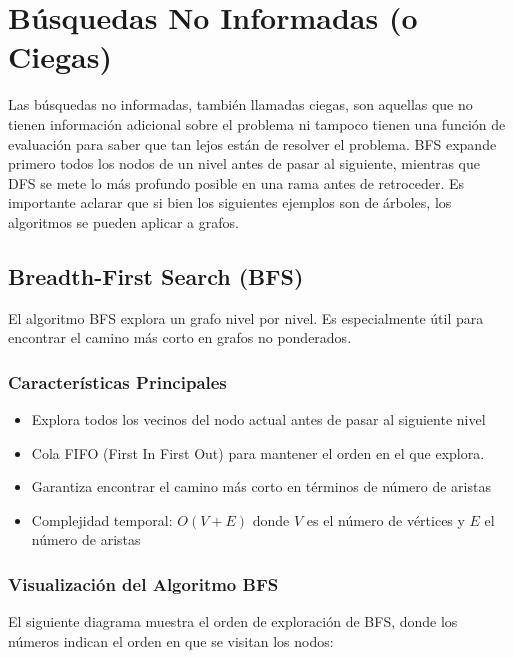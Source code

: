 \documentclass[12pt]{article}
\begin{document}
\section{Búsquedas No Informadas (o Ciegas)}

Las búsquedas no informadas, también llamadas ciegas, son aquellas que no tienen información adicional sobre el problema ni tampoco tienen una función de evaluación para saber que tan lejos están de resolver el problema. BFS expande primero todos los nodos de un nivel antes de pasar al siguiente, mientras que DFS se mete lo más profundo posible en una rama antes de retroceder. Es importante aclarar que si bien los siguientes ejemplos son de árboles, los algoritmos se pueden aplicar a grafos.

\subsection{Breadth-First Search (BFS)}
El algoritmo BFS explora un grafo nivel por nivel. Es especialmente útil para encontrar el camino más corto en grafos no ponderados.

\subsubsection{Características Principales}
\begin{itemize}
    \item Explora todos los vecinos del nodo actual antes de pasar al siguiente nivel
    \item Cola FIFO (First In First Out) para mantener el orden en el que explora.
    \item Garantiza encontrar el camino más corto en términos de número de aristas
    \item Complejidad temporal: $O(V + E)$ donde $V$ es el número de vértices y $E$ el número de aristas
\end{itemize}

\subsubsection{Visualización del Algoritmo BFS}
El siguiente diagrama muestra el orden de exploración de BFS, donde los números indican el orden en que se visitan los nodos:

\vspace{0.3em}
\end{document}
